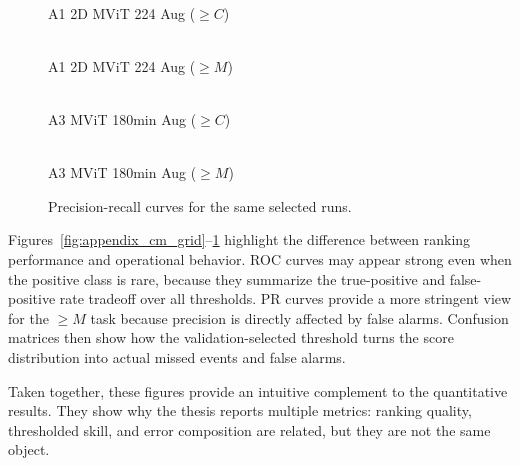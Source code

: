 \begin{figure}[!htbp]
\centering
\begin{minipage}{0.48\textwidth}
\centering
{}
\\[-1mm]\scriptsize A1 2D MViT 224 Aug ($\geq C$)
\end{minipage}\hfill
\begin{minipage}{0.48\textwidth}
\centering
{}
\\[-1mm]\scriptsize A1 2D MViT 224 Aug ($\geq M$)
\end{minipage}
\vspace{2mm}
\begin{minipage}{0.48\textwidth}
\centering
{}
\\[-1mm]\scriptsize A3 MViT 180min Aug ($\geq C$)
\end{minipage}\hfill
\begin{minipage}{0.48\textwidth}
\centering
{}
\\[-1mm]\scriptsize A3 MViT 180min Aug ($\geq M$)
\end{minipage}
\caption{Precision-recall curves for the same selected runs.}
\label{fig:appendix_pr_grid}
\end{figure}

\FloatBarrier

Figures~\ref{fig:appendix_cm_grid}--\ref{fig:appendix_pr_grid} highlight the difference between ranking performance and operational behavior. ROC curves may appear strong even when the positive class is rare, because they summarize the true-positive and false-positive rate tradeoff over all thresholds. PR curves provide a more stringent view for the $\geq M$ task because precision is directly affected by false alarms. Confusion matrices then show how the validation-selected threshold turns the score distribution into actual missed events and false alarms.

Taken together, these figures provide an intuitive complement to the quantitative results. They show why the thesis reports multiple metrics: ranking quality, thresholded skill, and error composition are related, but they are not the same object.

\let\cleardoublepage\origcleardoublepage
